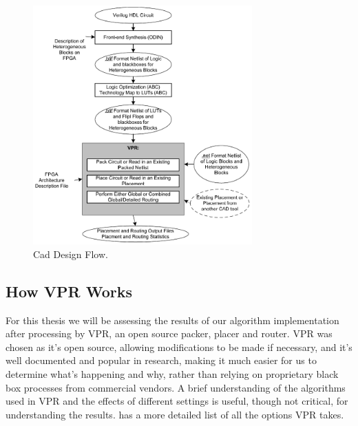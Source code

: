 \documentclass[12pt,drafta4paper,oneside]{memoir} %
\begin{document}
\begin{figure}
    \includegraphics[width=0.75\textwidth]{images/vpr-cad.png}
    \caption{Cad Design Flow.\cite{VPRManual}}
    \label{CADFlow}
\end{figure}
\subsection{How VPR Works}
For this thesis we will be assessing the results of our algorithm implementation after processing by \ac{VPR}, an open source packer, placer and router. \ac{VPR} was chosen as it's open source, allowing modifications to be made if necessary, and it's well documented and popular in research, making it much easier for us to determine what's happening and why, rather than relying on proprietary black box processes from commercial vendors.
A brief understanding of the algorithms used in \ac{VPR} and the effects of different settings is useful, though not critical, for understanding the results. \cite{VPRManual} has a more detailed list of all the options \ac{VPR} takes.
\end{document}
